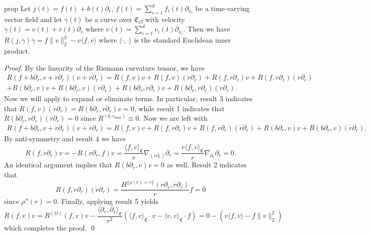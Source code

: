 \documentclass[11pt]{article}
\begin{document}
\begin{restatable}{prop}{} \label{jacobi equation on cone p2}
    Let $j(t) = f(t) + b(t)\partial_r$, $f(t) = \sum_{i = 1}^df_i(t)\partial_{x_i}$ be a time-varying vector field and let $\gamma(t)$ be a curve over $\mathfrak{C}_\Omega$ with velocity $\dot \gamma(t) = v(t) + \dot r(t)\partial_r$ where $v(t) = \sum_{i = 1}^dv_i(t)\partial_{x_i}$. Then we have $R(j, \dot \gamma)\dot \gamma = f\|v\|_2^2 - v\langle f, v\rangle$ where $\langle \cdot, \cdot \rangle$ is the standard Euclidean inner product.  
\end{restatable}
\noindent \textit{Proof.} By the linearity of the Riemann curvature tensor, we have
\begin{multline*}
    R(f + b\partial_r, v  + \dot r\partial_r)(v + \dot r\partial_r)  = R(f, v)v + R(f, v)(\dot r\partial_r) + R(f, \dot r\partial_r)v + R(f, \dot r\partial_r)(\dot r\partial_r)\\ + R(b\partial_r, v)v + R(b\partial_r, v)(\dot r\partial_r) + R(b\partial_r, \dot r\partial_r)v + R(b\partial_r, \dot r\partial_r)(\dot r\partial_r).
\end{multline*}
Now we will apply  to expand or eliminate terms. In particular, result 3 indicates that $R(f,v)(\dot r\partial_r) = R(b\partial_r, \dot r\partial_r)v = 0$, while result 1 indicates that $R(b\partial_r, \dot r\partial_r)(\dot r \partial_r) = 0$ since $R^{(0, r_{\max})} \equiv 0$. Now we are left with
\begin{align*}
    R(f + b\partial_r, v  + \dot r\partial_r)(v + \dot r\partial_r)  = R(f, v)v + R(f, \dot r\partial_r)v + R(f, \dot r\partial_r)(\dot r\partial_r) + R(b\partial_r, v)v + R(b\partial_r, v)(\dot r\partial_r).
\end{align*}
By anti-symmetry and result 4 we have
\[R(f, \dot r\partial_r)v = -R(\dot r\partial_r, f)v = \frac{\langle f, v \rangle_{\mathfrak{C}}}{r}\nabla_{(\dot r\partial_r)}\partial_r = \frac{\dot r\langle f, v \rangle_{\mathfrak{C}}}{r}\nabla_{\partial_r}\partial_r = 0.\]
An identical argument implies that $R(b\partial_r, v)v = 0$ as well. Result 2 indicates that
\[R(f, \dot r\partial_r)(\dot r\partial_r) = \frac{H^{\{\rho(r) = r\}}(\dot r\partial _r, \dot r\partial_r)}{r}f = 0\]
since $\rho''(r) = 0$. Finally, applying result 5 yields
\[R(f,v)v = R^{(\Omega)}(f,v)v - \frac{\langle \partial_r, \partial_r\rangle_{\mathfrak{C}}}{r^2}\left(\langle f, v\rangle_{\mathfrak{C}}\cdot v - \langle v, v\rangle_{\mathfrak{C}}\cdot f\right) = 0 - (v\langle f, v\rangle - f\|v\|_2^2)\]
which completes the proof. \qed{}
\end{document}

